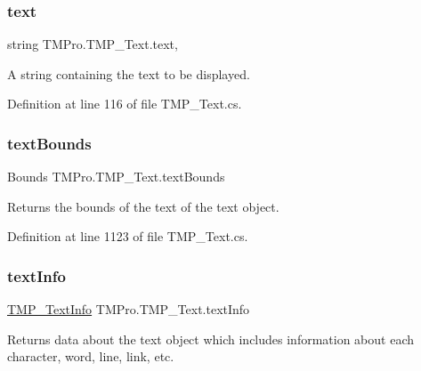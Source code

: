 \subsubsection{\texorpdfstring{text}{text}}
{\footnotesize\ttfamily string T\+M\+Pro.\+T\+M\+P\+\_\+\+Text.\+text\hspace{0.3cm}{\ttfamily [get]}, {\ttfamily [set]}}



A string containing the text to be displayed. 



Definition at line 116 of file T\+M\+P\+\_\+\+Text.\+cs.

\mbox{\label{class_t_m_pro_1_1_t_m_p___text_aa61944e2c4973b8b7b07df8d8f15e2c9}} 
\subsubsection{\texorpdfstring{textBounds}{textBounds}}
{\footnotesize\ttfamily Bounds T\+M\+Pro.\+T\+M\+P\+\_\+\+Text.\+text\+Bounds\hspace{0.3cm}{\ttfamily [get]}}



Returns the bounds of the text of the text object. 



Definition at line 1123 of file T\+M\+P\+\_\+\+Text.\+cs.

\mbox{\label{class_t_m_pro_1_1_t_m_p___text_a4b2d23d558ff8f9aecf5814f046bcef6}} 
\subsubsection{\texorpdfstring{textInfo}{textInfo}}
{\footnotesize\ttfamily \mbox{\hyperlink{class_t_m_pro_1_1_t_m_p___text_info}{T\+M\+P\+\_\+\+Text\+Info}} T\+M\+Pro.\+T\+M\+P\+\_\+\+Text.\+text\+Info\hspace{0.3cm}{\ttfamily [get]}}



Returns data about the text object which includes information about each character, word, line, link, etc. 



